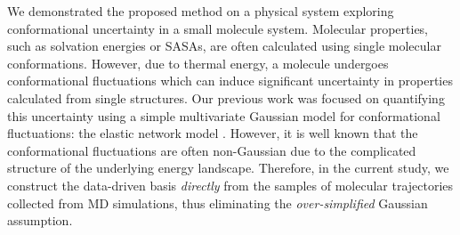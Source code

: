 We demonstrated the proposed method on a physical system exploring conformational uncertainty in a small molecule system.
Molecular properties, such as solvation energies or \acp{SASA}, are often calculated using single molecular conformations.
However, due to thermal energy, a molecule undergoes conformational fluctuations which can induce significant uncertainty in properties calculated from single structures.
Our previous work \cite{Lei_Yang_MMS_2015} was focused on quantifying this uncertainty using a simple multivariate Gaussian model for conformational fluctuations: the elastic network model \cite{Ati_Bahar_BJ_2001}.
However, it is well known that the conformational fluctuations are often non-Gaussian due to the complicated structure of the underlying energy landscape.
Therefore, in the current study, we construct the data-driven basis \emph{directly} from the samples of molecular trajectories collected from \ac{MD} simulations, thus eliminating the \emph{over-simplified} Gaussian assumption.

